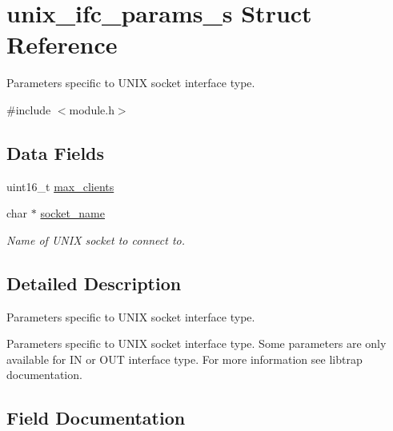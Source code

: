 \hypertarget{structunix__ifc__params__s}{}\section{unix\+\_\+ifc\+\_\+params\+\_\+s Struct Reference}
\label{structunix__ifc__params__s}


Parameters specific to U\+N\+IX socket interface type.  




{\ttfamily \#include $<$module.\+h$>$}

\subsection*{Data Fields}
\begin{DoxyCompactItemize}
\item 
uint16\+\_\+t \hyperlink{structunix__ifc__params__s_a23714e4d38adecccd0ae98344766383c}{max\+\_\+clients}
\item 
\mbox{\label{structunix__ifc__params__s_a48c558584ff05d4307032e5716ac35b5}} 
char $\ast$ \hyperlink{structunix__ifc__params__s_a48c558584ff05d4307032e5716ac35b5}{socket\+\_\+name}
\begin{DoxyCompactList}\small\item\em Name of U\+N\+IX socket to connect to. \end{DoxyCompactList}\end{DoxyCompactItemize}


\subsection{Detailed Description}
Parameters specific to U\+N\+IX socket interface type. 

Parameters specific to U\+N\+IX socket interface type. Some parameters are only available for IN or O\+UT interface type. For more information see libtrap documentation. 

\subsection{Field Documentation}
\mbox{\label{structunix__ifc__params__s_a23714e4d38adecccd0ae98344766383c}} 
